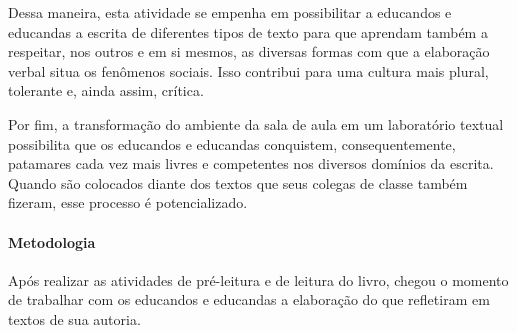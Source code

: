 \documentclass[12pt]{extarticle}
\begin{document}
Dessa maneira, esta atividade se empenha em possibilitar a educandos e
educandas a escrita de diferentes tipos de texto para que aprendam
também a respeitar, nos outros e em si mesmos, as diversas formas com
que a elaboração verbal situa os fenômenos sociais. Isso contribui para
uma cultura mais plural, tolerante e, ainda assim, crítica.

Por fim, a transformação do ambiente da sala de aula em um laboratório
textual possibilita que os educandos e educandas conquistem,
consequentemente, patamares cada vez mais livres e competentes nos
diversos domínios da escrita. Quando são colocados diante dos textos que
seus colegas de classe também fizeram, esse processo é potencializado.


\paragraph{Metodologia}

Após realizar as atividades de pré-leitura e de leitura do livro, chegou
o momento de trabalhar com os educandos e educandas a elaboração do que
refletiram em textos de sua autoria.
\end{document}
